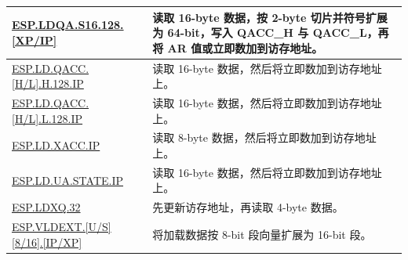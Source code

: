 \begin{longtable}[c]{|l|m{12cm}|}
\hyperref[instruction:ESPLDQAS16128XP]{ESP.LDQA.S16.128.[XP/IP]} & 读取 16-byte 数据，按 2-byte 切片并符号扩展为 64-bit，写入 QACC\_H 与 QACC\_L，再将 AR 值或立即数加到访存地址。\\\hline
\hyperref[instruction:ESPLDQACC_HH128IP]{ESP.LD.QACC.[H/L].H.128.IP} & 读取 16-byte 数据，然后将立即数加到访存地址上。\\\hline
\hyperref[instruction:ESPLDQACC_HL128IP]{ESP.LD.QACC.[H/L].L.128.IP} & 读取 16-byte 数据，然后将立即数加到访存地址上。\\\hline
\hyperref[instruction:ESPLDXACCIP]{ESP.LD.XACC.IP} & 读取 8-byte 数据，然后将立即数加到访存地址上。\\\hline
\hyperref[instruction:ESPLDUA_STATEIP]{ESP.LD.UA.STATE.IP} & 读取 16-byte 数据，然后将立即数加到访存地址上。\\\hline
\hyperref[instruction:ESPLDXQ32]{ESP.LDXQ.32} & 先更新访存地址，再读取 4-byte 数据。\\\hline
\hyperref[instruction:ESPVLDEXTU8IP]{ESP.VLDEXT.[U/S][8/16].[IP/XP]} & 将加载数据按 8-bit 段向量扩展为 16-bit 段。\\\hline


\end{longtable}